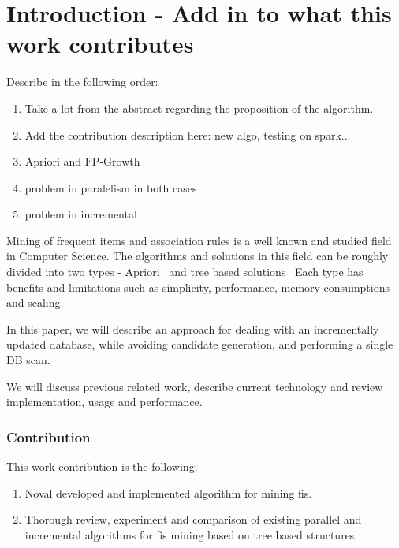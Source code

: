 \section{Introduction - Add in to what this work contributes}

Describe in the following order:
\begin{enumerate}
\item Take a lot from the abstract regarding the proposition of the algorithm.
\item Add the contribution description here: new algo, testing on spark...
\item Apriori and FP-Growth 
\item problem in paralelism in both cases 
\item problem in incremental
\end{enumerate}

Mining of frequent items and association rules is a well known and studied field in Computer Science.
 The algorithms and solutions in this field can be roughly divided into two types - Apriori~\cite{agrawal1994fast} and tree based solutions~\cite{tsay2009fiut,leung2005cantree,tanbeer2009efficient} Each type has benefits and limitations such as simplicity, performance, memory consumptions and scaling. 


In this paper, we will describe an approach for dealing with an incrementally updated database, while avoiding candidate generation, and performing a single DB scan.

We will discuss previous related work, describe current technology and review implementation, usage and performance.

\subsubsection{Contribution}
This work contribution is the following:
\begin{enumerate}
\item Noval developed and implemented algorithm for mining fis.
\item Thorough review, experiment and comparison of existing parallel and incremental algorithms for fis mining based on tree based structures.
\end{enumerate}